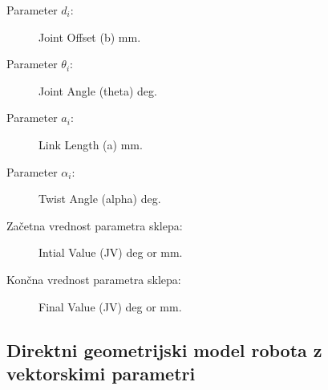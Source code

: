 \begin{description}
	\item[Parameter $d_i$:] Joint Offset (b) mm.
	\item[Parameter $\theta_i$:] Joint Angle (theta) deg.
	\item[Parameter $a_i$:] Link Length (a) mm.
	\item[Parameter $\alpha_i$:] Twist Angle (alpha) deg.
	\item[Začetna vrednost parametra sklepa:] Intial Value (JV) deg or mm.
	\item[Končna vrednost parametra sklepa:] Final Value (JV) deg or mm.	
\end{description}


\subsection{Direktni geometrijski model robota z vektorskimi parametri}

